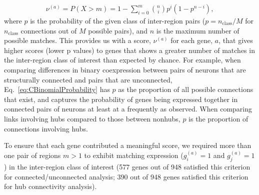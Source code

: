 \documentclass[10pt,letterpaper]{article}
\begin{document}
\begin{eqnarray}
	\label{eq:CBinomialProbability}
     \nu^{(a)} = P(X > m) = 1 - \sum_{i=0}^{m}\binom{n}{i} p^{i}(1-p^{n-i}),
\end{eqnarray}
where $p$ is the probability of the given class of inter-region pairs ($p = n_\mathrm{class}/M$ for $n_\mathrm{class}$ connections out of $M$ possible pairs), and $n$ is the maximum number of possible matches.
This provides us with a score, $\nu^{(a)}$ for each gene, $a$, that gives higher scores (lower p values) to genes that shows a greater number of matches in the inter-region class of interest than expected by chance.
For example, when comparing differences in binary coexpression between pairs of neurons that are structurally connected and pairs that are unconnected, Eq.~\eqref{eq:CBinomialProbability} has $p$ as the proportion of all possible connections that exist, and captures the probability of genes being expressed together in connected pairs of neurons at least at a frequently as observed.
When comparing links involving hubs compared to those between nonhubs, $p$ is the proportion of connections involving hubs.


To ensure that each gene contributed a meaningful score, we required more than one pair of regions $m > 1$ to exhibit matching expression ($g^{(a)}_i = 1$ and $g^{(a)}_j = 1$) in the inter-region class of interest (577 genes out of 948 satisfied this criterion for connected/unconnected analysis; 390 out of 948 genes satisfied this criterion for hub connectivity analysis).
\end{document}
